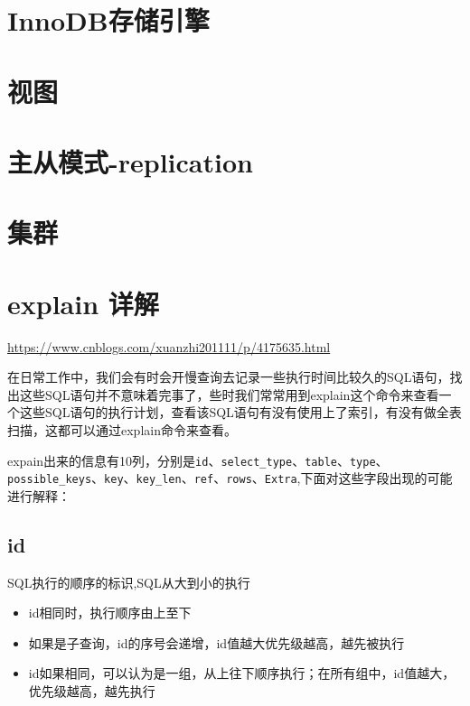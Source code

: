\documentclass[UTF8,a4paper,12pt]{ctexbook}
\begin{document}
	\section{InnoDB存储引擎}
	
	\section{视图}

	\section{主从模式-replication}
	
	\section{集群}

	\section{explain 详解}
		\url{https://www.cnblogs.com/xuanzhi201111/p/4175635.html}
		
		在日常工作中，我们会有时会开慢查询去记录一些执行时间比较久的SQL语句，找出这些SQL语句并不意味着完事了，些时我们常常用到explain这个命令来查看一个这些SQL语句的执行计划，查看该SQL语句有没有使用上了索引，有没有做全表扫描，这都可以通过explain命令来查看。
		
		expain出来的信息有10列，分别是\verb|id|、\verb|select_type|、\verb|table|、\verb|type|、\verb|possible_keys|、\verb|key|、\verb|key_len|、\verb|ref|、\verb|rows|、\verb|Extra|,下面对这些字段出现的可能进行解释：
		
		\subsection{id}
			SQL执行的顺序的标识,SQL从大到小的执行
			\begin{itemize}
				\item id相同时，执行顺序由上至下
				\item 如果是子查询，id的序号会递增，id值越大优先级越高，越先被执行
				\item id如果相同，可以认为是一组，从上往下顺序执行；在所有组中，id值越大，优先级越高，越先执行
			\end{itemize}
			
\end{document}
